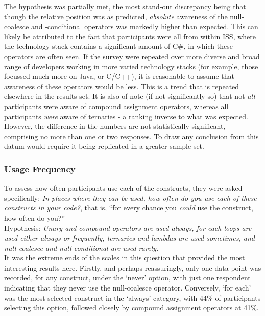 \documentclass{article}
\begin{document}
            The hypothesis was partially met, the most stand-out discrepancy being that though the relative position was as predicted, \emph{absolute} awareness of the null-coalesce and -conditional operators was markedly higher than expected. This can likely be attributed to the fact that participants were all from within ISS, where the  technology stack contains a significant amount of C\#, in which these operators are often seen. If the survey were repeated over more diverse and broad range of developers working in more varied technology stacks (for example, those focussed much more on Java, or C/C++), it is reasonable to assume that awareness of these operators would be less. This is a trend that is repeated elsewhere in the results set.
            It is also of note (if not significantly so) that not \emph{all} participants were aware of compound assignment operators, whereas all participants \emph{were} aware of ternaries - a ranking inverse to what was expected. However, the difference in the numbers are not statistically significant, comprising no more than one or two responses. To draw any conclusion from this datum would require it being replicated in a greater sample set.
        \subsubsection{Usage Frequency}
            To assess how often participants use each of the constructs, they were asked specifically: \textit{In places where they can be used, how often do you use each of these constructs in your code?}, that is, ``for every chance you \emph{could} use the construct, how often do you?''
            \\\newline
            Hypothesis: \textit{Unary and compound operators are used always, for each loops are used either always or frequently, ternaries and lambdas are used sometimes, and null-coalesce and null-conditional are used rarely.}
            \\\newline
            It was the extreme ends of the scales in this question that provided the most interesting results here. Firstly, and perhaps reassuringly, only one data point was recorded, for any construct, under the `never' option, with just one respondent indicating that they never use the null-coalesce operator. Conversely, `for each' was the most selected construct in the `always' category, with 44\% of participants selecting this option, followed closely by compound assignment operators at 41\%.
\end{document}
